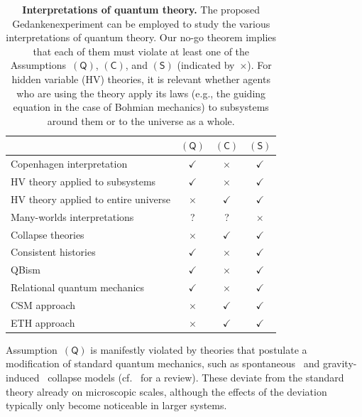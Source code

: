 \documentclass[12pt]{article}
\theoremstyle{mystyle}
\theoremstyle{definition}
\newcommand*{\QT}{\mathsf{(Q)}}
\newcommand*{\SW}{\mathsf{(S)}}
\newcommand*{\SelfCons}{\mathsf{(C)}}
\begin{document}
{
\newcommand*{\lC}[1]{{\footnotesize #1}}
\begin{table}
\begin{center}
\begin{tabular}{p{5.5cm}ccc}
\toprule
 & $\QT$ & $\SelfCons$ & $\SW$ \\[0.1ex]
\midrule
\lC{Copenhagen interpretation} & $\checkmark$ & $\times$ & $\checkmark$ \\[-0.5ex]
\lC{HV theory applied to subsystems} & $\checkmark$ & $\times$ & $\checkmark$ \\[-0.5ex]
\lC{HV theory applied to entire universe} & $\times$ & $\checkmark$ & $\checkmark$  \\[-0.5ex]
\lC{Many-worlds interpretations} & ? & ? & $\times$ \\[-0.5ex]
\lC{Collapse theories} & $\times$ & $\checkmark$ & $\checkmark$ \\[-0.5ex]
\lC{Consistent histories} & $\checkmark$ & $\times$ & $\checkmark$ \\[-0.5ex]
\lC{QBism} & $\checkmark$ & $\times$ & $\checkmark$ \\[-0.5ex]
\lC{Relational quantum mechanics} & $\checkmark$ & $\times$ & $\checkmark$ \\[-0.5ex]
\lC{CSM approach} & $\times$ & $\checkmark$ & $\checkmark$ \\[-0.5ex]
\lC{ETH approach} & $\times$ & $\checkmark$ & $\checkmark$ \\[-0.1ex]
  \bottomrule
\end{tabular}
  \vspace{-2ex}
\end{center}
\caption{{\bf Interpretations of quantum theory.}  The proposed Gedankenexperiment can be employed to study the various interpretations of quantum theory. Our no-go theorem implies that each of them must violate at least one of the Assumptions~$\QT$, $\SelfCons$, and $\SW$ (indicated by~$\times$). For hidden variable (HV) theories,  it is relevant whether agents who are using the theory apply its laws  (e.g., the guiding equation in the case of Bohmian mechanics)  to subsystems around them or to the universe as a whole.\label{tab_interpretations}}

\end{table}
}

Assumption~$\QT$ is manifestly violated by theories that postulate a modification of  standard quantum mechanics, such as spontaneous~\cite{GhRiWe86,Gisin89,Pearle89, Tumulka06,Weinberg12} and gravity-induced~\cite{Karolyhazy66,Diosi89,Penrose96} collapse models (cf.\ \cite{Bassietal13} for a review).
These deviate from the standard theory already on microscopic scales, although the effects of the deviation typically only become noticeable in larger systems. 
\end{document}
